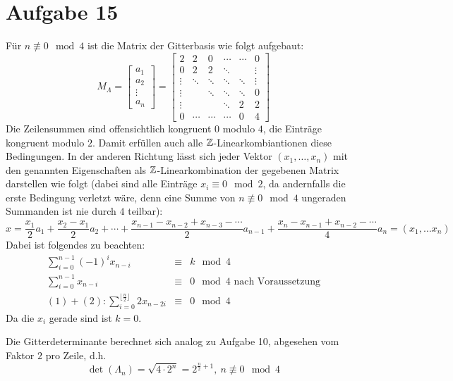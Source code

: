\section*{Aufgabe 15}
Für $n \not\equiv 0\mod4$ ist die Matrix der Gitterbasis wie folgt aufgebaut:
\[
M_\Lambda = \begin{bmatrix} a_1 \\ a_2 \\ \vdots \\ a_n \end{bmatrix} = 
	\begin{bmatrix}
		2&2&0&\cdots&\cdots&0\\
		0&2&2&\ddots&&\vdots\\
		\vdots&\ddots&\ddots&\ddots&\ddots&\vdots\\
		\vdots&&\ddots&\ddots&\ddots&0\\
		\vdots&&&\ddots&2&2\\
		0&\cdots&\cdots&\cdots&0&4
	\end{bmatrix}
\]
Die Zeilensummen sind offensichtlich kongruent $0$ modulo $4$, die Einträge
kongruent modulo $2$. Damit erfüllen auch alle $\mathbb{Z}$-Linearkombiantionen diese
Bedingungen. In der anderen Richtung lässt sich jeder Vektor $(x_1,\dots,x_n)$
mit den genannten Eigenschaften als $\mathbb{Z}$-Linearkombination der gegebenen Matrix
darstellen wie folgt (dabei sind alle Einträge $x_i \equiv 0\mod2$, da
andernfalls die erste Bedingung verletzt wäre, denn eine Summe von $n
\not\equiv 0\mod4$ ungeraden Summanden ist nie durch $4$ teilbar):
\[ x = \frac{x_1}{2} a_1 + \frac{x_2-x_1}{2} a_2 + \cdots +
\frac{x_{n-1}-x_{n-2}+x_{n-3}-\cdots}{2} a_{n-1} +
\frac{x_n-x_{n-1}+x_{n-2}-\cdots}{4} a_n = (x_1, \dots x_n) \]
Dabei ist folgendes zu beachten:
\begin{eqnarray}
	\sum_{i=0}^{n-1} (-1)^i x_{n-i} &\equiv& k\mod 4 \\
	\sum_{i=0}^{n-1} x_{n-i} &\equiv& 0\mod 4 \text{ nach Voraussetzung} \\
	\nonumber (1) + (2): \sum_{i=0}^{\lfloor\frac{n}{2}\rfloor} 2 x_{n-2i} &\equiv& 0\mod 4
\end{eqnarray}
Da die $x_i$ gerade sind ist $k = 0$.

Die Gitterdeterminante berechnet sich analog zu Aufgabe 10, abgesehen vom
Faktor $2$ pro Zeile, d.h.
\[ \det(\Lambda_n) = \sqrt{4\cdot2^n} = 2^{\frac{n}{2} + 1},\ n \not\equiv 0\mod4 \]


